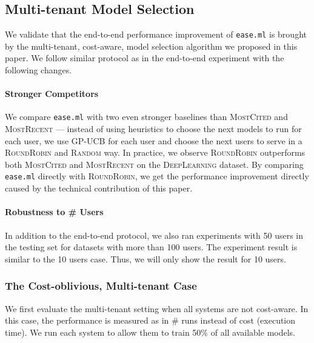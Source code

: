 \documentclass[letterpaper]{vldb}
\newcommand{\eml}{\texttt{ease.ml}\xspace}
\begin{document}
\subsection{Multi-tenant Model Selection}

We validate that the end-to-end performance
improvement of \eml is brought by the
multi-tenant, cost-aware, model selection
algorithm we proposed in this paper.
We follow similar protocol as in the
end-to-end experiment with the following changes.

\vspace{-0.5em}
\paragraph*{Stronger Competitors} We compare
\eml with two even stronger baselines
than \textsc{MostCited} and \textsc{MostRecent} ---
instead of using heuristics to choose the
next models to run for each user, we
use GP-UCB for each user and
choose the next users to serve 
in a \textsc{RoundRobin} 
and \textsc{Random} way. In practice,
we observe \textsc{RoundRobin} outperforms both 
\textsc{MostCited} and \textsc{MostRecent}
on the \textsc{DeepLearning} dataset.
By comparing \eml directly with
\textsc{RoundRobin}, we get the performance improvement directly caused by 
the technical contribution of this paper.

\vspace{-0.5em}
\paragraph*{Robustness to \# Users}

In addition to the end-to-end
protocol, we also ran
experiments with 50 users
in the testing set for datasets
with more than 100 users. The experiment
result is similar to the 10 users case.
Thus, we will only show the
result for 10 users.

\vspace{-0.5em}
\subsubsection{The Cost-oblivious, Multi-tenant Case}

We first evaluate the multi-tenant setting
when all systems are not cost-aware. In this
case, the performance is measured as in
\# runs instead of cost (execution time).
We run each system to allow them to
train 50\% of all available models.

\vspace{-1em}
\end{document}

